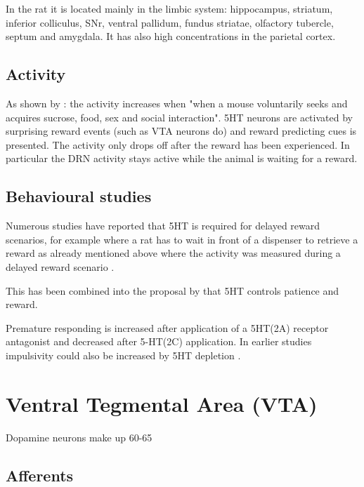 \documentclass[12pt,a4paper]{article}
\begin{document}
In the rat it is located mainly in the limbic system: hippocampus, striatum, inferior colliculus, SNr, ventral pallidum, fundus striatae, olfactory tubercle, septum and amygdala. It has also high concentrations in the parietal cortex.




\subsection{Activity}

As shown by \citep{Li2016}: the activity increases when "when a mouse voluntarily seeks and acquires sucrose, food, sex and social interaction". 5HT neurons are activated by surprising reward events (such as VTA neurons do) and reward predicting cues is presented. The activity only drops off after the reward has been experienced. In particular the DRN activity stays active while the animal is waiting for a reward.

\subsection{Behavioural studies}

Numerous studies have reported that 5HT is required for delayed reward scenarios, for example where a rat has to wait in front of a dispenser to retrieve a reward \citep{Khani2016} as already mentioned above where the activity was measured during a delayed reward scenario \citep{Li2016}.

This has been combined into the proposal by \citep{Miyazaki2012} that 5HT controls patience and reward.

Premature responding is increased after \citep{Fletcher2007} application of a 5HT(2A) receptor antagonist and decreased after 5-HT(2C) application. In earlier studies impulsivity could also be increased by 5HT depletion \citep{Harrison1997}.







\section{Ventral Tegmental Area (VTA)}

Dopamine neurons make up 60-65%

\subsection{Afferents}
\end{document}
